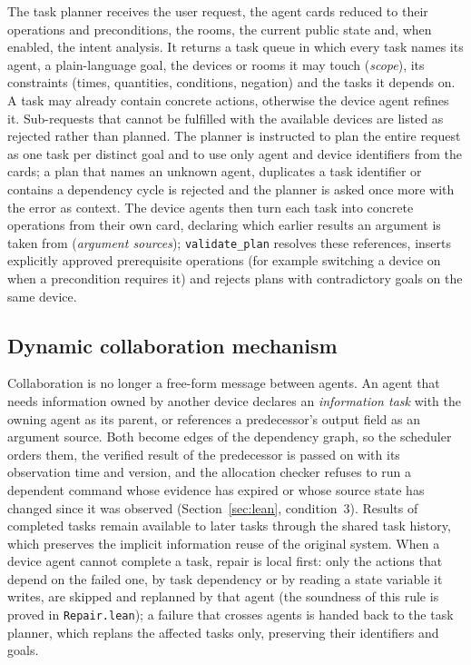 \documentclass[a4paper,11pt]{article}
\begin{document}
The task planner receives the user request, the agent cards reduced to their operations and
preconditions, the rooms, the current public state and, when enabled, the intent analysis. It
returns a task queue in which every task names its agent, a plain-language goal, the devices or
rooms it may touch (\emph{scope}), its constraints (times, quantities, conditions, negation) and
the tasks it depends on. A task may already contain concrete actions, otherwise the device agent
refines it. Sub-requests that cannot be fulfilled with the available devices are listed as
rejected rather than planned. The planner is instructed to plan the entire request as one task
per distinct goal and to use only agent and device identifiers from the cards; a plan that names
an unknown agent, duplicates a task identifier or contains a dependency cycle is rejected and the
planner is asked once more with the error as context. The device agents then turn each task into
concrete operations from their own card, declaring which earlier results an argument is taken
from (\emph{argument sources}); \texttt{validate\_plan} resolves these references, inserts
explicitly approved prerequisite operations (for example switching a device on when a
precondition requires it) and rejects plans with contradictory goals on the same device.

\subsection{Dynamic collaboration mechanism}
\label{sec:collaboration}

Collaboration is no longer a free-form message between agents. An agent that needs information
owned by another device declares an \emph{information task} with the owning agent as its
parent, or references a predecessor's output field as an argument source. Both become edges of
the dependency graph, so the scheduler orders them, the verified result of the predecessor is
passed on with its observation time and version, and the allocation checker refuses to run a
dependent command whose evidence has expired or whose source state has changed since it was
observed (Section~\ref{sec:lean}, condition~3). Results of completed tasks remain available to
later tasks through the shared task history, which preserves the implicit information reuse of
the original system. When a device agent cannot complete a task, repair is local first: only the
actions that depend on the failed one, by task dependency or by reading a state variable it
writes, are skipped and replanned by that agent (the soundness of this rule is proved in
\texttt{Repair.lean}); a failure that crosses agents is handed back to the task planner, which
replans the affected tasks only, preserving their identifiers and goals.
\end{document}

